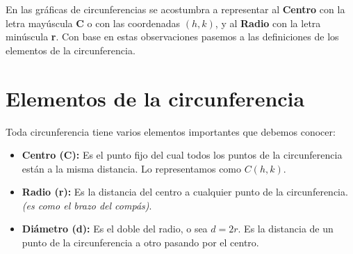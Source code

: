 \documentclass[12pt,a4paper]{article}
\begin{document}
	\bigskip

	En las gráficas de circunferencias se acostumbra a representar al \textbf{Centro} con la letra mayúscula \textbf{C} o con las coordenadas \textbf{$(h,k)$}, y al \textbf{Radio} con la letra minúscula \textbf{r}. Con base en estas observaciones pasemos a las definiciones de los elementos de la circunferencia.

	\section{Elementos de la circunferencia}

	\noindent
	\begin{minipage}[t]{0.52\textwidth}
	Toda circunferencia tiene varios elementos importantes que debemos conocer:

	\begin{itemize}
		\item \textbf{Centro (C):} Es el punto fijo del cual todos los puntos de la circunferencia están a la misma distancia. Lo representamos como $C(h,k)$.

		\item \textbf{Radio (r):} Es la distancia del centro a cualquier punto de la circunferencia. \emph{(es como el brazo del compás)}.

		\item \textbf{Diámetro (d):} Es el doble del radio, o sea $d=2r$. Es la distancia de un punto de la circunferencia a otro pasando por el centro.

	\end{itemize}
	\end{minipage}%
	\hfill
\end{document}
